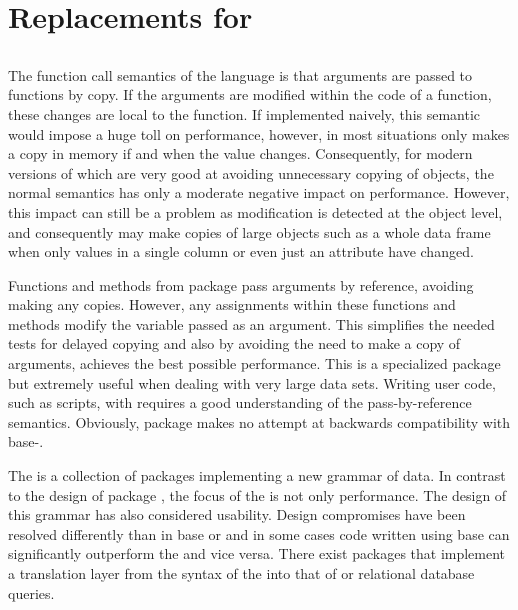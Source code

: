 \documentclass[krantz2]{krantz}\usepackage{knitr}
\begin{document}
\section[Replacements for \texttt{data.frame}]{Replacements for }
\subsection{}
The function call semantics of the \Rlang language is that arguments are passed to functions by copy. If the arguments are modified within the code of a function, these changes are local to the function. If implemented naively, this semantic would impose a huge toll on performance, however, \Rlang in most situations only makes a copy in memory if and when the value changes. Consequently, for modern versions of \Rlang which are very good at avoiding unnecessary copying of objects, the normal \Rlang semantics has only a moderate negative impact on performance. However, this impact can still be a problem as modification is detected at the object level, and consequently \Rlang may make copies of large objects such as a whole data frame when only values in a single column or even just an attribute have changed.

Functions and methods from package  pass arguments by reference, avoiding making any copies. However, any assignments within these functions and methods modify the variable passed as an argument. This simplifies the needed tests for delayed copying and also by avoiding the need to make a copy of arguments, achieves the best possible performance. This is a specialized package but extremely useful when dealing with very large data sets. Writing user code, such as scripts, with  requires a good understanding of the pass-by-reference semantics. Obviously, package  makes no attempt at backwards compatibility with base-\Rlang {}.

The  is a collection of packages implementing a new grammar of data. In contrast to the design of package , the focus of the  is not only performance. The design of this grammar has also considered usability. Design compromises have been resolved differently than in base \Rlang or  and in some cases code written using base \Rlang can significantly outperform the  and vice versa. There exist packages that implement a translation layer from the syntax of the  into that of  or relational database queries.
\end{document}
